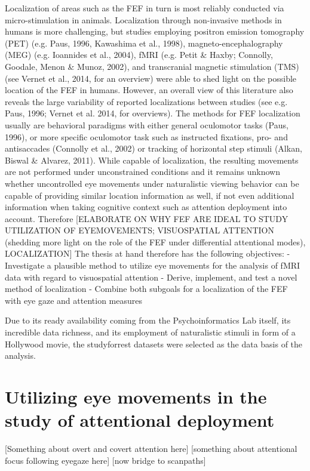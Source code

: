 \documentclass[a4paper, 11pt]{scrreprt}
\begin{document}
Localization of areas such as the FEF in turn is most reliably conducted via micro-stimulation in animals. Localization through non-invasive methods in humans is more challenging, but studies employing positron emission tomography (PET) (e.g. Paus, 1996, Kawashima et al., 1998), magneto-encephalography (MEG) (e.g. Ioannides et al., 2004), fMRI (e.g. Petit \& Haxby; Connolly, Goodale, Menon \& Munoz, 2002), and transcranial magnetic stimulation (TMS) (see Vernet et al., 2014, for an overview) were able to shed light on the possible location of the FEF in humans.  However, an overall view of this literature also reveals the large variability of reported localizations between studies (see e.g. Paus, 1996; Vernet et al. 2014, for overviews). The methods for FEF localization usually are behavioral paradigms with either general oculomotor tasks (Paus, 1996), or more specific oculomotor task such as instructed fixations, pro- and antisaccades (Connolly et al., 2002) or tracking of horizontal step stimuli (Alkan, Biswal \& Alvarez, 2011). While capable of localization, the resulting movements are not performed under unconstrained conditions and it remains unknown whether uncontrolled eye movements under naturalistic viewing behavior can be capable of providing similar location information as well, if not even additional information when taking cognitive context such as attention deployment into account.\newline
Therefore [ELABORATE ON WHY FEF ARE IDEAL TO STUDY UTILIZATION OF EYEMOVEMENTS; VISUOSPATIAL ATTENTION (shedding more light on the role of the FEF under differential attentional modes), LOCALIZATION]
The thesis at hand therefore has the following objectives:
- Investigate a plausible method to utilize eye movements for the analysis of fMRI data with regard to visuospatial attention
- Derive, implement, and test a novel method of localization
- Combine both subgoals for a localization of the FEF with eye gaze and attention measures

Due to its ready availability coming from the Psychoinformatics Lab itself, its incredible data richness, and its employment of naturalistic stimuli in form of a Hollywood movie, the studyforrest datasets were selected as the data basis of the analysis.

\section{Utilizing eye movements in the study of attentional deployment}
[Something about overt and covert attention here]
[something about attentional focus following eyegaze here]
[now bridge to scanpaths]
\end{document}

